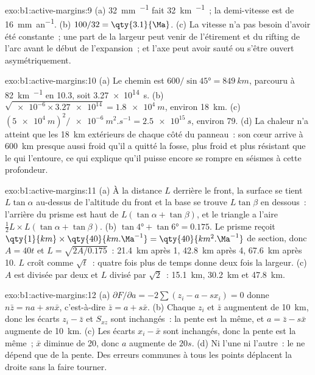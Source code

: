 \begin{solution}{exo:b1:active-margins:9}
(a) \qty{32}{mm.\year^{-1}} fait \qty{32}{km.\Ma^{-1}}~; la demi-vitesse est de
\qty{16}{mm.an^{-1}}. (b) $100/32 = \qty{3.1}{\Ma}$. (c) La vitesse n'a pas besoin d'avoir
été constante~; une part de la largeur
peut venir de l'étirement et du rifting de l'arc avant le début de l'expansion~;
et l'axe peut avoir sauté ou s'être ouvert asymétriquement.
\end{solution}

\begin{solution}{exo:b1:active-margins:10}
(a) Le chemin est $600/\sin\ang{45} = \qty{849}{km}$, parcouru à
\qty{82}{km.\Ma^{-1}} en \qty{10.3}{\Ma}, soit \qty{3.27e14}{s}.
(b) $\sqrt{\num{e-6}\times\num{3.27e14}} = \qty{1.8e4}{m}$, environ
\qty{18}{km}. (c) $(\qty{5e4}{m})^2/\qty{e-6}{m^2.s^{-1}} = \qty{2.5e15}{s}$,
environ \qty{79}{\Ma}. (d) La chaleur n'a atteint que les \qty{18}{km} extérieurs de chaque
côté du panneau~: son cœur arrive à \qty{600}{km} presque aussi froid qu'il a quitté
la fosse, plus froid et plus résistant que le  qui l'entoure, ce qui explique qu'il puisse
encore se rompre en séismes à cette profondeur.
\end{solution}

\begin{solution}{exo:b1:active-margins:11}
(a) À la distance $L$ derrière le front, la surface se tient $L\tan\alpha$ au-dessus de
l'altitude du front et la base se trouve $L\tan\beta$ en dessous~: l'arrière du
prisme est haut de $L(\tan\alpha + \tan\beta)$, et le triangle a l'aire
$\frac12 L\times L(\tan\alpha + \tan\beta)$. (b) $\tan\ang{4} + \tan\ang{6} =
0.175$. Le prisme reçoit $\qty{1}{km}\times\qty{40}{km.\Ma^{-1}} =
\qty{40}{km^2.\Ma^{-1}}$ de section, donc $A = 40t$ et
$L = \sqrt{2A/0.175}$~: \qty{21.4}{km} après \qty{1}{\Ma}, \qty{42.8}{km}
après \qty{4}{\Ma}, \qty{67.6}{km} après \qty{10}{\Ma}. $L$ croît comme
$\sqrt t$~: quatre fois plus de temps donne deux fois la largeur. (c) $A$ est divisée par deux et $L$
divisé par $\sqrt2$~: \qty{15.1}{km}, \qty{30.2}{km} et \qty{47.8}{km}.
\end{solution}

\begin{solution}{exo:b1:active-margins:12}
(a) $\partial F/\partial a = -2\sum(z_i - a - s x_i) = 0$ donne
$n\bar z = na + sn\bar x$, c'est-à-dire $\bar z = a + s\bar x$. (b) Chaque $z_i$ et
$\bar z$ augmentent de \qty{10}{km}, donc les écarts $z_i - \bar z$ et $S_{xz}$
sont inchangés~: la pente est la même, et $a = \bar z - s\bar x$ augmente de
\qty{10}{km}. (c) Les écarts $x_i - \bar x$ sont inchangés, donc la pente est
la même~; $\bar x$ diminue de 20, donc $a$ augmente de $20s$. (d) Ni l'une ni l'autre~:
le  ne dépend que de la pente. Des erreurs communes à tous les points déplacent la
droite sans la faire tourner.
\end{solution}

